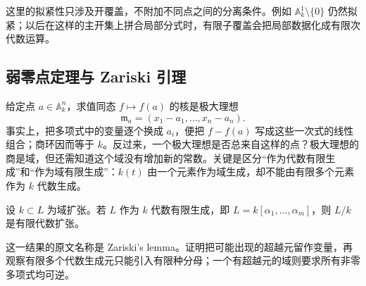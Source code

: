 这里的拟紧性只涉及开覆盖，不附加不同点之间的分离条件。例如 \(\mathbb A_k^1\setminus\{0\}\) 仍然拟紧；以后在这样的主开集上拼合局部分式时，有限子覆盖会把局部数据化成有限次代数运算。

\subsection{弱零点定理与 Zariski 引理}
\label{g5:subsec:0101:03}

给定点 \(a\in\mathbb A_k^n\)，求值同态 \(f\mapsto f(a)\) 的核是极大理想
\[
	\mathfrak m_a=(x_1-a_1,\ldots,x_n-a_n).
\]
事实上，把多项式中的变量逐个换成 \(a_i\)，便把 \(f-f(a)\) 写成这些一次式的线性组合；商环因而等于 \(k\)。反过来，一个极大理想是否总来自这样的点？极大理想的商是域，但还需知道这个域没有增加新的常数。关键是区分“作为代数有限生成”和“作为域有限生成”：\(k(t)\) 由一个元素作为域生成，却不能由有限多个元素作为 \(k\) 代数生成。

\begin{lemma}[Zariski 引理]\label{g5:lem:zariski}
	设 \(k\subset L\) 为域扩张。若 \(L\) 作为 \(k\) 代数有限生成，即 \(L=k[\alpha_1,\ldots,\alpha_m]\)，则 \(L/k\) 是有限代数扩张。
\end{lemma}

这一结果的原文名称是 Zariski's lemma。证明把可能出现的超越元留作变量，再观察有限多个代数生成元只能引入有限种分母；一个有超越元的域则要求所有非零多项式均可逆。

